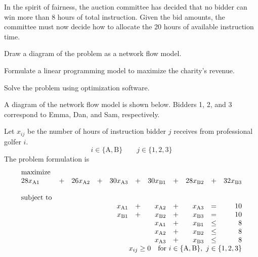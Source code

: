 \begin{enumerate}
In the spirit of fairness, the auction committee has decided that no bidder can win 
more than 8 hours of total instruction. Given the bid amounts, the committee must now
decide how to allocate the 20 hours of available instruction time.
\begin{compactenum}
  \item Draw a diagram of the problem as a network flow model.
  \item Formulate a linear programming model to maximize the
    charity's revenue.
  \item Solve the problem using optimization software.
\end{compactenum}

\begin{solution}
  \bs A diagram of the network flow model is shown below. Bidders 1, 2,
  and 3 correspond to Emma, Dan, and Sam, respectively.
\vspace{.2in}
\begin{center}
\end{center}

Let $x_{ij}$ be the number of hours of instruction bidder $j$ receives
from professional golfer $i$.
  \[
     i \in \{\text{A},\text{B}\} \qquad j \in \{1,2,3\}
  \]
  The problem formulation is
\[
  \begin{array}{lrrrrrrrrrr}
    \textrm{maximize} &&&&&&&&&&\\   
    28x_{\text{A}1}&+& 26x_{\text{A}2}&+&30x_{\text{A}3}&+&30x_{\text{B}1}&+&28x_{\text{B}2}&+&32x_{\text{B}3} \\ \\
    \textrm{subject to}  &&&&&&&&&&\\
    & & & & x_{\text{A}1}&+ & x_{\text{A}2}&+ &x_{\text{A}3} & = & 10 \\
    & & & & x_{\text{B}1}&+ & x_{\text{B}2}&+ &x_{\text{B}3} & = & 10 \\
    & & & & & &  x_{\text{A}1} & + & x_{\text{B}1} & \leq & 8 \\
    & & & & & &  x_{\text{A}2} & + & x_{\text{B}2} & \leq & 8 \\
    & & & & & &  x_{\text{A}3} & + & x_{\text{B}3} & \leq & 8 \\
    \multicolumn{11}{r}{x_{ij} \geq 0 \quad \text{for}~i \in \{\text{A},\text{B}\},~j \in \{1,2,3\} }
  \end{array}
\]


\end{solution}
\end{enumerate}

